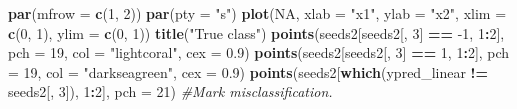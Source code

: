 \documentclass[10pt,ignorenonframetext,]{beamer}
\newenvironment{Shaded}{\begin{snugshade}}{\end{snugshade}}
\newcommand{\KeywordTok}[1]{\textcolor[rgb]{0.13,0.29,0.53}{\textbf{#1}}}
\newcommand{\DataTypeTok}[1]{\textcolor[rgb]{0.13,0.29,0.53}{#1}}
\newcommand{\DecValTok}[1]{\textcolor[rgb]{0.00,0.00,0.81}{#1}}
\newcommand{\FloatTok}[1]{\textcolor[rgb]{0.00,0.00,0.81}{#1}}
\newcommand{\StringTok}[1]{\textcolor[rgb]{0.31,0.60,0.02}{#1}}
\newcommand{\CommentTok}[1]{\textcolor[rgb]{0.56,0.35,0.01}{\textit{#1}}}
\newcommand{\OtherTok}[1]{\textcolor[rgb]{0.56,0.35,0.01}{#1}}
\newcommand{\OperatorTok}[1]{\textcolor[rgb]{0.81,0.36,0.00}{\textbf{#1}}}
\newcommand{\NormalTok}[1]{#1}
\begin{document}
\begin{frame}[fragile]

\footnotesize

\begin{Shaded}
\begin{Highlighting}[]
\KeywordTok{par}\NormalTok{(}\DataTypeTok{mfrow =} \KeywordTok{c}\NormalTok{(}\DecValTok{1}\NormalTok{, }\DecValTok{2}\NormalTok{))}
\KeywordTok{par}\NormalTok{(}\DataTypeTok{pty =} \StringTok{"s"}\NormalTok{)}
\KeywordTok{plot}\NormalTok{(}\OtherTok{NA}\NormalTok{, }\DataTypeTok{xlab =} \StringTok{"x1"}\NormalTok{, }\DataTypeTok{ylab =} \StringTok{"x2"}\NormalTok{, }\DataTypeTok{xlim =} \KeywordTok{c}\NormalTok{(}\DecValTok{0}\NormalTok{, }\DecValTok{1}\NormalTok{), }\DataTypeTok{ylim =} \KeywordTok{c}\NormalTok{(}\DecValTok{0}\NormalTok{, }\DecValTok{1}\NormalTok{))}
\KeywordTok{title}\NormalTok{(}\StringTok{"True class"}\NormalTok{)}
\KeywordTok{points}\NormalTok{(seeds2[seeds2[, }\DecValTok{3}\NormalTok{] }\OperatorTok{==}\StringTok{ }\DecValTok{-1}\NormalTok{, }\DecValTok{1}\OperatorTok{:}\DecValTok{2}\NormalTok{], }\DataTypeTok{pch =} \DecValTok{19}\NormalTok{, }\DataTypeTok{col =} \StringTok{"lightcoral"}\NormalTok{, }
    \DataTypeTok{cex =} \FloatTok{0.9}\NormalTok{)}
\KeywordTok{points}\NormalTok{(seeds2[seeds2[, }\DecValTok{3}\NormalTok{] }\OperatorTok{==}\StringTok{ }\DecValTok{1}\NormalTok{, }\DecValTok{1}\OperatorTok{:}\DecValTok{2}\NormalTok{], }\DataTypeTok{pch =} \DecValTok{19}\NormalTok{, }\DataTypeTok{col =} \StringTok{"darkseagreen"}\NormalTok{, }
    \DataTypeTok{cex =} \FloatTok{0.9}\NormalTok{)}
\KeywordTok{points}\NormalTok{(seeds2[}\KeywordTok{which}\NormalTok{(ypred_linear }\OperatorTok{!=}\StringTok{ }\NormalTok{seeds2[, }\DecValTok{3}\NormalTok{]), }\DecValTok{1}\OperatorTok{:}\DecValTok{2}\NormalTok{], }\DataTypeTok{pch =} \DecValTok{21}\NormalTok{)  }\CommentTok{#Mark misclassification.}


\end{Highlighting}
\end{Shaded}
\end{frame}
\end{document}
